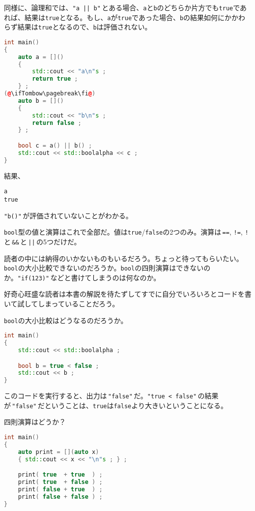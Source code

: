 同様に、論理和では、\texttt{"a || b"}\,とある場合、\texttt{a}と\texttt{b}のどちらか片方でも\texttt{true}であれば、結果は\texttt{true}となる。もし、\texttt{a}が\texttt{true}であった場合、\texttt{b}の結果如何にかかわらず結果は\texttt{true}となるので、\texttt{b}は評価されない。

\begin{lstlisting}[language={C++}]
int main()
{
    auto a = []()
    {
        std::cout << "a\n"s ;
        return true ;
    } ;
(@\ifTombow\pagebreak\fi@)
    auto b = []()
    {
        std::cout << "b\n"s ;
        return false ;
    } ;

    bool c = a() || b() ;
    std::cout << std::boolalpha << c ; 
}
\end{lstlisting}

結果、

\begin{lstlisting}[style=terminal]
a
true
\end{lstlisting}

\texttt{"b()"}\,が評価されていないことがわかる。


\texttt{bool}型の値と演算はこれで全部だ。値は\texttt{true}/\texttt{false}の2つのみ。演算は\,\texttt{==}, \texttt{!=}, \texttt{!}\,と\,\texttt{\&\&}\,と\,\texttt{||}\,の5つだけだ。

読者の中には納得のいかないものもいるだろう。ちょっと待ってもらいたい。\texttt{bool}の大小比較できないのだろうか。\texttt{bool}の四則演算はできないのか。\texttt{"if(123)"}\,などと書けてしまうのは何なのか。

好奇心旺盛な読者は本書の解説を待たずしてすでに自分でいろいろとコードを書いて試してしまっていることだろう。

\texttt{bool}の大小比較はどうなるのだろうか。

\begin{lstlisting}[language={C++}]
int main()
{
    std::cout << std::boolalpha ;

    bool b = true < false ;
    std::cout << b ;
}
\end{lstlisting}

このコードを実行すると、出力は\,\texttt{"false"}\,だ。\texttt{"true < false"}\,の結果が\,\texttt{"false"}\,だということは、\texttt{true}は\texttt{false}より大きいということになる。

四則演算はどうか？

\ifTombow\pagebreak\fi
\begin{lstlisting}[language={C++}]
int main()
{
    auto print = [](auto x)
    { std::cout << x << "\n"s ; } ;

    print( true  + true  ) ;
    print( true  + false ) ;
    print( false + true  ) ;
    print( false + false ) ;
}
\end{lstlisting}

